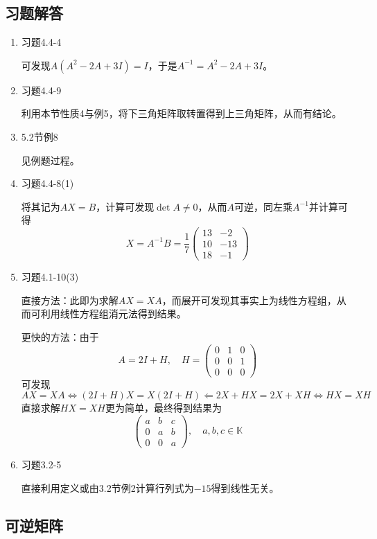 \documentclass[a4paper,UTF8,fontset=windows]{ctexart}
\begin{document}
\subsection{习题解答}
\begin{enumerate}
    \item 习题4.4-4
    
    可发现$A(A^2-2A+3I)=I$，于是$A^{-1}=A^2-2A+3I$。

    \item 习题4.4-9
    
    利用本节性质4与例5，将下三角矩阵取转置得到上三角矩阵，从而有结论。

    \item 5.2节例8
    
    见例题过程。

    \item 习题4.4-8(1)
    
    将其记为$AX=B$，计算可发现$\det A\ne0$，从而$A$可逆，同左乘$A^{-1}$并计算可得
    $$X=A^{-1}B=\frac{1}{7}\begin{pmatrix}13&-2\\10&-13\\18&-1\end{pmatrix}$$

    \item 习题4.1-10(3)
    
    直接方法：此即为求解$AX=XA$，而展开可发现其事实上为线性方程组，从而可利用线性方程组消元法得到结果。

    更快的方法：由于
    $$A=2I+H,\quad H=\begin{pmatrix}0&1&0\\0&0&1\\0&0&0\end{pmatrix}$$
    可发现
    $$AX=XA\Longleftrightarrow(2I+H)X=X(2I+H)\Longleftarrow 2X+HX=2X+XH\Longleftrightarrow HX=XH$$
    直接求解$HX=XH$更为简单，最终得到结果为
    $$\begin{pmatrix}a&b&c\\0&a&b\\0&0&a\end{pmatrix},\quad a,b,c\in\mathbb{K}$$

    \item 习题3.2-5
    
    直接利用定义或由3.2节例2计算行列式为$-15$得到线性无关。
\end{enumerate}

\subsection{可逆矩阵}
\end{document}
